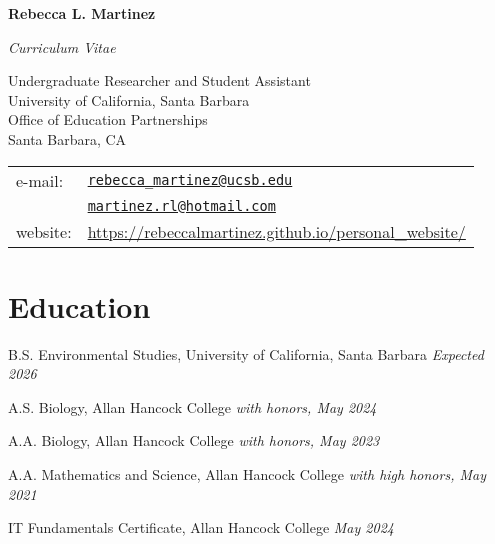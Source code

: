 \documentclass[letterpaper]{article}
\def\name{Rebecca L. Martinez}
\renewenvironment{itemize}{
  \begin{list}{}{
    \setlength{\leftmargin}{1.5em}
  }
}{
  \end{list}
}
\begin{document}
\centerline{\huge \bf \name}
\begin{center}
  \emph{Curriculum Vitae}
\end{center}


\vspace{0.25in}

\begin{minipage}{0.55\linewidth}
Undergraduate Researcher and Student Assistant\\
University of California, Santa Barbara\\
Office of Education Partnerships\\
Santa Barbara, CA
\end{minipage}
\begin{minipage}{0.45\linewidth}
  \begin{tabular}{ll}
    e-mail: & \href{mailto:rebecca_martinez@ucsb.edu}{\tt rebecca\_martinez@ucsb.edu} \\
            & \href{mailto:martinez.rl@hotmail.com}{\tt martinez.rl@hotmail.com} \\
    website: & \href{https://rebeccalmartinez.github.io/personal_website/}{\url{https://rebeccalmartinez.github.io/personal_website/}}

  \end{tabular}
\end{minipage}


\section*{Education}


\begin{itemize}
  \item B.S. Environmental Studies, University of California, Santa Barbara  
  \emph{Expected 2026}

  \item A.S. Biology, Allan Hancock College  
  \emph{with honors, May 2024}

  \item A.A. Biology, Allan Hancock College  
  \emph{with honors, May 2023}

  \item A.A. Mathematics and Science, Allan Hancock College  
  \emph{with high honors, May 2021}

  \item IT Fundamentals Certificate, Allan Hancock College  
  \emph{May 2024}
\end{itemize}
\end{document}
